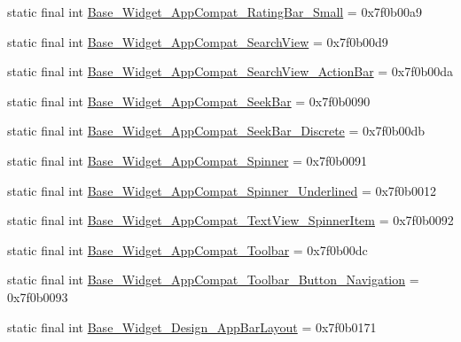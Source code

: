 \begin{CompactItemize}
\item 
static final int \hyperlink{classandroid_1_1support_1_1graphics_1_1drawable_1_1animated_1_1_r_1_1style_121501e78bae844fe7ab18ed161522ff}{Base\_\-Widget\_\-AppCompat\_\-RatingBar\_\-Small} = 0x7f0b00a9
\item 
static final int \hyperlink{classandroid_1_1support_1_1graphics_1_1drawable_1_1animated_1_1_r_1_1style_8f0a8d76fbfe6432b1c7a84131b8ca8d}{Base\_\-Widget\_\-AppCompat\_\-SearchView} = 0x7f0b00d9
\item 
static final int \hyperlink{classandroid_1_1support_1_1graphics_1_1drawable_1_1animated_1_1_r_1_1style_d951cceff16df2bdda341a70024cd4e0}{Base\_\-Widget\_\-AppCompat\_\-SearchView\_\-ActionBar} = 0x7f0b00da
\item 
static final int \hyperlink{classandroid_1_1support_1_1graphics_1_1drawable_1_1animated_1_1_r_1_1style_7e61317ddac2d3a5c8459231faf2b34a}{Base\_\-Widget\_\-AppCompat\_\-SeekBar} = 0x7f0b0090
\item 
static final int \hyperlink{classandroid_1_1support_1_1graphics_1_1drawable_1_1animated_1_1_r_1_1style_e1e5fca0a2f8a0bbeafe854bf29e65e3}{Base\_\-Widget\_\-AppCompat\_\-SeekBar\_\-Discrete} = 0x7f0b00db
\item 
static final int \hyperlink{classandroid_1_1support_1_1graphics_1_1drawable_1_1animated_1_1_r_1_1style_514415fcca6ec2fcc0804727a80731c3}{Base\_\-Widget\_\-AppCompat\_\-Spinner} = 0x7f0b0091
\item 
static final int \hyperlink{classandroid_1_1support_1_1graphics_1_1drawable_1_1animated_1_1_r_1_1style_6d17b23faaa8e225ed0101d5d10400af}{Base\_\-Widget\_\-AppCompat\_\-Spinner\_\-Underlined} = 0x7f0b0012
\item 
static final int \hyperlink{classandroid_1_1support_1_1graphics_1_1drawable_1_1animated_1_1_r_1_1style_9beded553da63a6ce66d040a7909ab3f}{Base\_\-Widget\_\-AppCompat\_\-TextView\_\-SpinnerItem} = 0x7f0b0092
\item 
static final int \hyperlink{classandroid_1_1support_1_1graphics_1_1drawable_1_1animated_1_1_r_1_1style_d0baffa1268d516d00b25158862b887b}{Base\_\-Widget\_\-AppCompat\_\-Toolbar} = 0x7f0b00dc
\item 
static final int \hyperlink{classandroid_1_1support_1_1graphics_1_1drawable_1_1animated_1_1_r_1_1style_a19872c15b0070b9ae88ea8610910096}{Base\_\-Widget\_\-AppCompat\_\-Toolbar\_\-Button\_\-Navigation} = 0x7f0b0093
\item 
static final int \hyperlink{classandroid_1_1support_1_1graphics_1_1drawable_1_1animated_1_1_r_1_1style_b386783cb49b3cf5fa2e2822301d6753}{Base\_\-Widget\_\-Design\_\-AppBarLayout} = 0x7f0b0171

\end{CompactItemize}
